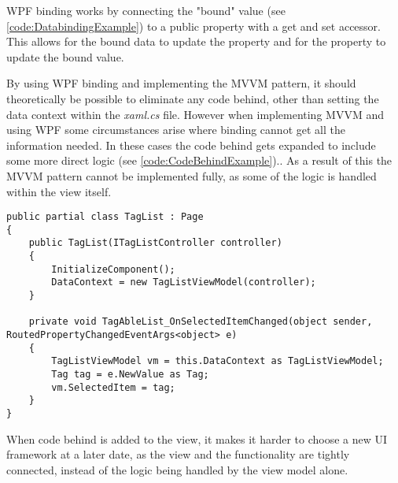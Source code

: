 WPF binding works by connecting the "bound" value (see \autoref{code:DatabindingExample}) to a public property with a get and set accessor. This allows for the bound data to update the property and for the property to update the bound value. 
\par
By using WPF binding and implementing the MVVM pattern, it should theoretically be possible to eliminate any code behind, other than setting the data context within the \textit{xaml.cs} file. However when implementing MVVM and using WPF some circumstances arise where binding cannot get all the information needed. In these cases the code behind gets expanded to include some more direct logic (see \autoref{code:CodeBehindExample}).. As a result of this the MVVM pattern cannot be implemented fully, as some of the logic is handled within the view itself.

\begin{listing}[H]
\begin{verbatim}
public partial class TagList : Page
{
    public TagList(ITagListController controller)
    {
        InitializeComponent();
        DataContext = new TagListViewModel(controller);
    }
    
    private void TagAbleList_OnSelectedItemChanged(object sender, RoutedPropertyChangedEventArgs<object> e)
    {
        TagListViewModel vm = this.DataContext as TagListViewModel;
        Tag tag = e.NewValue as Tag;
        vm.SelectedItem = tag;
    }
}
\end{verbatim}
\label{code:CodeBehindExample}
\end{listing}

When code behind is added to the view, it makes it harder to choose a new UI framework at a later date, as the view and the functionality are tightly connected, instead of the logic being handled by the view model alone.
